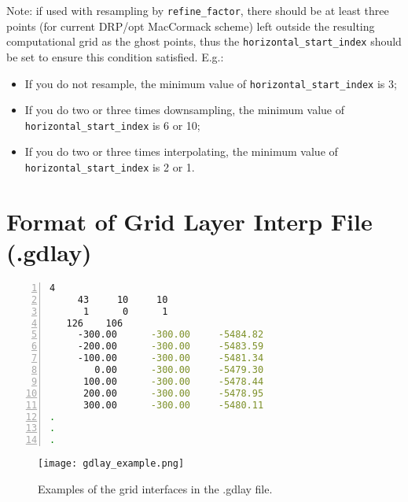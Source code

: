 \begin{itemize}
\begin{itemize}
    \end{itemize}
    Note: if used with resampling by \verb|refine_factor|,
      there should be at least three points (for current DRP/opt MacCormack scheme) left
          outside the resulting computational grid as the ghost points,
          thus the \verb|horizontal_start_index| should be set to ensure this condition satisfied.
    E.g.:
    \begin{itemize}
      \item If you do not resample, the minimum value of \verb|horizontal_start_index| is 3;
      \item If you do two or three times  downsampling,
          the minimum value of \verb|horizontal_start_index| is 6 or 10;
      \item If you do two or three times interpolating,
        the minimum value of \verb|horizontal_start_index| is 2 or 1.
\end{itemize}


\section{Format of Grid Layer Interp File (.gdlay)} \label{gridlayerinterp}

\begin{lstlisting}[language=bash,
    numbers=left, numbersep=5pt,numberstyle=\tiny\color{codegray},
    commentstyle=\color{codegreen},
    caption={Example of .gdlay file},
    label={lst_grid_gdlay},
    frame=tb]
     4
     43     10     10
      1      0      1
   126    106
     -300.00      -300.00     -5484.82
     -200.00      -300.00     -5483.59
     -100.00      -300.00     -5481.34
        0.00      -300.00     -5479.30
      100.00      -300.00     -5478.44
      200.00      -300.00     -5478.95
      300.00      -300.00     -5480.11
.
.
.
\end{lstlisting}

\begin{figure}
    \centering
    \texttt{[image: gdlay\_example.png]}
    \caption{Examples of the grid interfaces in the .gdlay file.}
    \label{fig_gdlay}
\end{figure}



\end{itemize}
